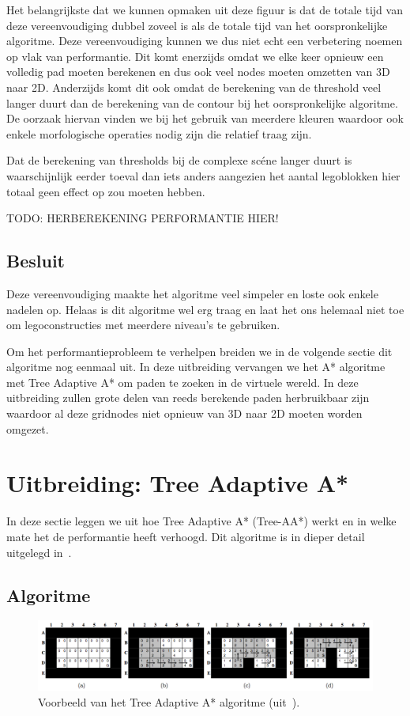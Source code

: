 Het belangrijkste dat we kunnen opmaken uit deze figuur is dat de totale tijd van deze vereenvoudiging dubbel zoveel is als de totale tijd van het oorspronkelijke algoritme. Deze vereenvoudiging kunnen we dus niet echt een verbetering noemen op vlak van performantie. Dit komt enerzijds omdat we elke keer opnieuw een volledig pad moeten berekenen en dus ook veel nodes moeten omzetten van 3D naar 2D. Anderzijds komt dit ook omdat de berekening van de threshold veel langer duurt dan de berekening van de contour bij het oorspronkelijke algoritme. De oorzaak hiervan vinden we bij het gebruik van meerdere kleuren waardoor ook enkele morfologische operaties nodig zijn die relatief traag zijn.

Dat de berekening van thresholds bij de complexe sc\'ene langer duurt is waarschijnlijk eerder toeval dan iets anders aangezien het aantal legoblokken hier totaal geen effect op zou moeten hebben.

TODO: HERBEREKENING PERFORMANTIE HIER! %

\subsection{Besluit}
Deze vereenvoudiging maakte het algoritme veel simpeler en loste ook enkele nadelen op. Helaas is dit algoritme wel erg traag en laat het ons helemaal niet toe om legoconstructies met meerdere niveau's te gebruiken.

Om het performantieprobleem te verhelpen breiden we in de volgende sectie dit algoritme nog eenmaal uit. In deze uitbreiding vervangen we het A* algoritme met Tree Adaptive A* om paden te zoeken in de virtuele wereld. In deze uitbreiding zullen grote delen van reeds berekende paden herbruikbaar zijn waardoor al deze gridnodes niet opnieuw van 3D naar 2D moeten worden omgezet.
 
\section{Uitbreiding: Tree Adaptive A*}
In deze sectie leggen we uit hoe Tree Adaptive A* (Tree-AA*) werkt en in welke mate het de performantie heeft verhoogd. Dit algoritme is in dieper detail uitgelegd in~\cite{hernandez2011tree}.

\subsection{Algoritme}

\begin{figure}
  \centering
  \includegraphics[width=\linewidth]{img/TAAStar}
  \caption{Voorbeeld van het Tree Adaptive A* algoritme (uit~\cite{hernandez2011tree}).}
  \label{fig:taastar}
\end{figure}

